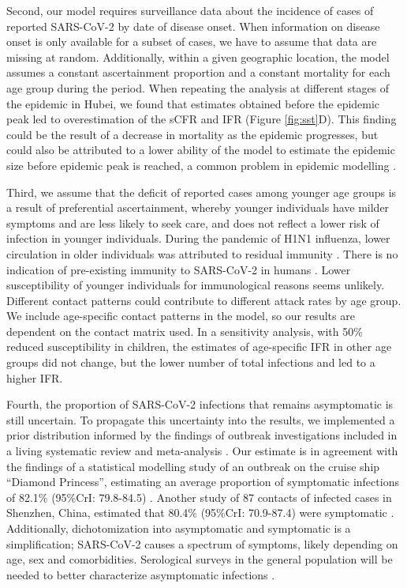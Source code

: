 \documentclass{article}
\begin{document}
Second, our model requires surveillance data about the incidence of cases of reported SARS-CoV-2 by date of disease onset. 
When information on disease onset is only available for a subset of cases, we have to assume that data are missing at random. Additionally, within a given geographic location, the model assumes a constant ascertainment proportion and a constant mortality for each age group during the period. 
When repeating the analysis at different stages of the epidemic in Hubei, we found that estimates obtained before the epidemic peak led to overestimation of the sCFR and IFR (Figure \ref{fig:sst}D). 
This finding could be the result of a decrease in mortality as the epidemic progresses, but could also be attributed to a lower ability of the model to estimate the epidemic size before epidemic peak is reached, a common problem in epidemic modelling \cite{riou2018improving}. 

Third, we assume that the deficit of reported cases among younger age groups is a result of preferential ascertainment, whereby younger individuals have milder symptoms and are less likely to seek care, and does not reflect a lower risk of infection in younger individuals. 
During the pandemic of H1N1 influenza, lower circulation in older individuals was attributed to residual immunity \cite{perez2009residual}. 
There is no indication of pre-existing immunity to SARS-CoV-2 in humans \cite{jointmission}. 
Lower susceptibility of younger individuals for immunological reasons seems unlikely.
Different contact patterns could contribute to different attack rates by age group. 
We include age-specific contact patterns in the model, so our results are dependent on the contact matrix used. 
In a sensitivity analysis, with 50\% reduced susceptibility in children, the estimates of age-specific IFR in other age groups did not change, but the lower number of total infections and led to a higher IFR.

Fourth, the proportion of SARS-CoV-2 infections that remains asymptomatic is still uncertain. 
To propagate this uncertainty into the results, we implemented a prior distribution informed by the findings of outbreak investigations included in a living systematic review and meta-analysis \cite{buitrago2020role,updatebuitrago2020role}. 
Our estimate is in agreement with the findings of a statistical modelling study of an outbreak on the cruise ship ``Diamond Princess'', estimating an average proportion of symptomatic infections of 82.1\% (95\%CrI: 79.8-84.5) \cite{mizumoto2020estimating}. 
Another study of 87 contacts of infected cases in Shenzhen, China, estimated that 80.4\% (95\%CrI: 70.9-87.4) were symptomatic \cite{bi2020epidemiology}. 
Additionally, dichotomization into asymptomatic and symptomatic is a simplification; SARS-CoV-2 causes a spectrum of symptoms, likely depending on age, sex and comorbidities.
Serological surveys in the general population will be needed to better characterize asymptomatic infections \cite{carrat2008time}.
\end{document}
